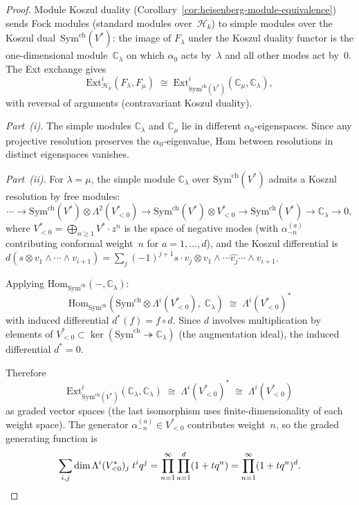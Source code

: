\begin{proof}
Module Koszul duality
(Corollary~\ref{cor:heisenberg-module-equivalence}) sends
Fock modules (standard modules over~$\mathcal{H}_k$) to
simple modules over the Koszul dual~$\mathrm{Sym}^{\mathrm{ch}}(V^*)$:
the image of $F_\lambda$ under the Koszul duality functor is the
one-dimensional module~$\mathbb{C}_\lambda$ on which $\alpha_0$ acts
by~$\lambda$ and all other modes act by~$0$.  The Ext exchange gives
\begin{equation}\label{eq:fock-ext-exchange}
\mathrm{Ext}^i_{\mathcal{H}_k}(F_\lambda, F_\mu)
\;\cong\;
\mathrm{Ext}^i_{\mathrm{Sym}^{\mathrm{ch}}(V^*)}
(\mathbb{C}_\mu, \mathbb{C}_\lambda),
\end{equation}
with reversal of arguments (contravariant Koszul duality).

\emph{Part~(i).}
The simple modules $\mathbb{C}_\lambda$ and $\mathbb{C}_\mu$ lie in
different $\alpha_0$-eigenspaces.  Since any projective resolution
preserves the $\alpha_0$-eigenvalue, $\mathrm{Hom}$ between
resolutions in distinct eigenspaces vanishes.

\emph{Part~(ii).}
For $\lambda = \mu$, the simple module $\mathbb{C}_\lambda$ over
$\mathrm{Sym}^{\mathrm{ch}}(V^*)$ admits a Koszul resolution by
free modules:
\[
\cdots \to \mathrm{Sym}^{\mathrm{ch}}(V^*) \otimes \Lambda^2(V^*_{<0})
\to \mathrm{Sym}^{\mathrm{ch}}(V^*) \otimes V^*_{<0}
\to \mathrm{Sym}^{\mathrm{ch}}(V^*) \to \mathbb{C}_\lambda \to 0,
\]
where $V^*_{<0} = \bigoplus_{n \geq 1} V^* \cdot z^n$ is the
space of negative modes (with $\alpha_{-n}^{(a)}$ contributing
conformal weight~$n$ for $a = 1, \ldots, d$), and the Koszul
differential is
$d(s \otimes v_1 \wedge \cdots \wedge v_{i+1})
= \sum_j (-1)^{j+1} s \cdot v_j \otimes
v_1 \wedge \cdots \widehat{v_j} \cdots \wedge v_{i+1}$.

Applying $\mathrm{Hom}_{\mathrm{Sym}^{\mathrm{ch}}}
(-, \mathbb{C}_\lambda)$:
\[
\mathrm{Hom}_{\mathrm{Sym}^{\mathrm{ch}}}
(\mathrm{Sym}^{\mathrm{ch}} \otimes \Lambda^i(V^*_{<0}),\;
\mathbb{C}_\lambda)
\;\cong\; \Lambda^i(V^*_{<0})^*
\]
with induced differential $d^*(f) = f \circ d$.  Since $d$ involves
multiplication by elements of $V^*_{<0} \subset
\ker(\mathrm{Sym}^{\mathrm{ch}} \twoheadrightarrow \mathbb{C}_\lambda)$
(the augmentation ideal), the induced differential $d^* = 0$.

Therefore
\[
\mathrm{Ext}^i_{\mathrm{Sym}^{\mathrm{ch}}(V^*)}
(\mathbb{C}_\lambda, \mathbb{C}_\lambda)
\;\cong\; \Lambda^i(V^*_{<0})^*
\;\cong\; \Lambda^i(V^*_{<0})
\]
as graded vector spaces (the last isomorphism uses
finite-dimensionality of each weight space).
The generator $\alpha_{-n}^{(a)} \in V^*_{<0}$ contributes weight~$n$,
so the graded generating function is
\[
\sum_{i,j} \dim \Lambda^i(V^*_{<0})_j\; t^i q^j
= \prod_{n=1}^{\infty}\prod_{a=1}^{d} (1 + t q^n)
= \prod_{n=1}^{\infty}(1 + tq^n)^d. \qedhere
\]
\end{proof}

